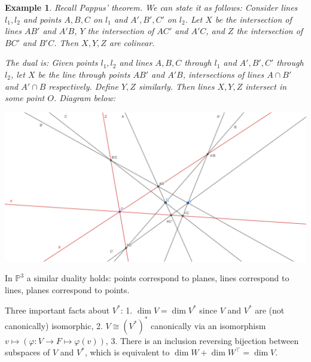 \documentclass[12pt]{article}
\renewcommand{\P}{\mathbb{P}}
\renewcommand{\phi}{\varphi}
\newtheorem*{example}{Example}
\begin{document}
    \begin{example}
        Recall Pappus' theorem. We can state it as follows: Consider lines $l_1, l_2$ and points $A, B, C$ on $l_1$ and $A', B', C'$ on $l_2$. Let $X$ be the intersection of lines $AB'$ and $A'B$, $Y$ the intersection of $AC'$ and $A'C$, and $Z$ the intersection of $BC'$ and $B'C$. Then $X, Y, Z$ are colinear. \par
        The dual is: Given points $l_1, l_2$ and lines $A, B, C$ through $l_1$ and $A', B', C'$ through $l_2$, let $X$ be the line through points $AB'$ and $A'B$, intersections of lines $A \cap B'$ and $A' \cap B$ respectively. Define $Y, Z$ similarly. Then lines $X, Y, Z$ intersect in some point $O$. Diagram below:
        \begin{center}
            \includegraphics[width = \linewidth]{pappus_dual.png}
        \end{center}
    \end{example}
    In $\P^3$ a similar duality holds: points correspond to planes, lines correspond to lines, planes correspond to points. \par
    Three important facts about $V^*$: 1. $\dim V = \dim V^*$ since $V$ and $V^*$ are (not canonically) isomorphic, 2. $V \cong (V^*)^*$ canonically via an isomorphism $v \mapsto (\phi: V \to F \mapsto \phi(v))$, 3. There is an inclusion reversing bijection between subspaces of $V$ and $V^*$, which is equivalent to $\dim W + \dim W^\top = \dim V$.
\end{document}
